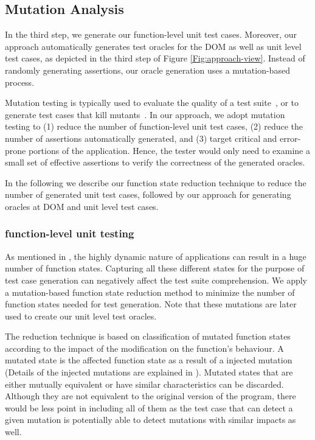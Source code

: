 \subsection{Mutation Analysis} \label{Sec:mutationAnalysis}
In the third step, we generate our function-level unit test cases. Moreover, our approach automatically generates test oracles for the DOM as well as unit level test cases, as depicted in the third step of Figure \ref{Fig:approach-view}. 
Instead of randomly generating assertions, our oracle generation uses a mutation-based process.

Mutation testing is typically used to evaluate the quality of a test suite~\cite{demillo:computer1978}, or to generate test cases that kill mutants~\cite{fraser:tse12}. In our approach, we adopt mutation testing to (1) reduce the number of function-level unit test cases, (2) reduce the number of assertions automatically generated, and (3) target critical  and error-prone portions of the application. 
Hence, the tester would only need to examine a small set of effective assertions to verify the correctness of the generated oracles.

In the following we describe our function state reduction technique to reduce the number of generated unit test cases, followed by our approach for generating oracles at DOM and unit level test cases.   

\subsubsection{\javascript function-level unit testing} \label{Sec:jsFuncTest}

As mentioned in , the highly dynamic nature of \javascript applications can result in a huge number of function states. Capturing all these different states for the purpose of test case generation can negatively affect the test suite comprehension. 
We apply a mutation-based function state reduction method to minimize the number of function states needed for test generation. Note that these mutations are later used to create our unit level test oracles.

 The reduction technique is based on classification of mutated function states according to the impact of the modification on the function's behaviour. A mutated state is the affected function state as a result of a injected mutation (Details of the injected mutations are explained in ). 
Mutated states that are either mutually equivalent or have similar characteristics can be discarded. Although they are not equivalent to the original version of the program, there would be less point in including all of them as the test case that can detect a given mutation is potentially able to detect mutations with similar impacts as well.

